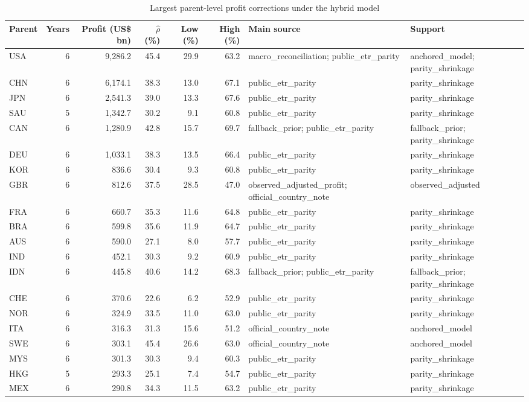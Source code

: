 \begin{table}[H]
\centering
\scriptsize
\caption{Largest parent-level profit corrections under the hybrid model}
\label{tab:profit_correction_parent_year_top20}
\begin{adjustbox}{max width=\textwidth,center}
\begin{tabular}{@{}lrrrrrL{3.0cm}L{2.7cm}@{}}
\toprule
Parent & Years & Profit (US\$ bn) & $\hat{\rho}$ (\%) & Low (\%) & High (\%) & Main source & Support \\
\midrule
USA & 6 & 9,286.2 & 45.4 & 29.9 & 63.2 & macro\_reconciliation; public\_etr\_parity & anchored\_model; parity\_shrinkage \\
CHN & 6 & 6,174.1 & 38.3 & 13.0 & 67.1 & public\_etr\_parity & parity\_shrinkage \\
JPN & 6 & 2,541.3 & 39.0 & 13.3 & 67.6 & public\_etr\_parity & parity\_shrinkage \\
SAU & 5 & 1,342.7 & 30.2 &  9.1 & 60.8 & public\_etr\_parity & parity\_shrinkage \\
CAN & 6 & 1,280.9 & 42.8 & 15.7 & 69.7 & fallback\_prior; public\_etr\_parity & fallback\_prior; parity\_shrinkage \\
DEU & 6 & 1,033.1 & 38.3 & 13.5 & 66.4 & public\_etr\_parity & parity\_shrinkage \\
KOR & 6 &   836.6 & 30.4 &  9.3 & 60.8 & public\_etr\_parity & parity\_shrinkage \\
GBR & 6 &   812.6 & 37.5 & 28.5 & 47.0 & observed\_adjusted\_profit; official\_country\_note & observed\_adjusted \\
FRA & 6 &   660.7 & 35.3 & 11.6 & 64.8 & public\_etr\_parity & parity\_shrinkage \\
BRA & 6 &   599.8 & 35.6 & 11.9 & 64.7 & public\_etr\_parity & parity\_shrinkage \\
AUS & 6 &   590.0 & 27.1 &  8.0 & 57.7 & public\_etr\_parity & parity\_shrinkage \\
IND & 6 &   452.1 & 30.3 &  9.2 & 60.9 & public\_etr\_parity & parity\_shrinkage \\
IDN & 6 &   445.8 & 40.6 & 14.2 & 68.3 & fallback\_prior; public\_etr\_parity & fallback\_prior; parity\_shrinkage \\
CHE & 6 &   370.6 & 22.6 &  6.2 & 52.9 & public\_etr\_parity & parity\_shrinkage \\
NOR & 6 &   324.9 & 33.5 & 11.0 & 63.0 & public\_etr\_parity & parity\_shrinkage \\
ITA & 6 &   316.3 & 31.3 & 15.6 & 51.2 & official\_country\_note & anchored\_model \\
SWE & 6 &   303.1 & 45.4 & 26.6 & 63.0 & official\_country\_note & anchored\_model \\
MYS & 6 &   301.3 & 30.3 &  9.4 & 60.3 & public\_etr\_parity & parity\_shrinkage \\
HKG & 5 &   293.3 & 25.1 &  7.4 & 54.7 & public\_etr\_parity & parity\_shrinkage \\
MEX & 6 &   290.8 & 34.3 & 11.5 & 63.2 & public\_etr\_parity & parity\_shrinkage \\
\bottomrule
\end{tabular}
\end{adjustbox}


\end{table}

